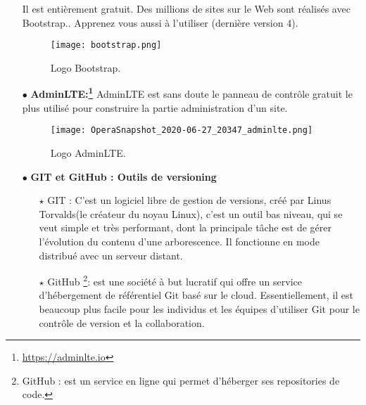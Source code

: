\begin{itemize}
Il est entièrement gratuit. Des millions de sites sur le Web sont réalisés avec Bootstrap.. Apprenez vous aussi à l’utiliser (dernière version 4).\cite{wiki:Bootstrap_(front-end_framework)}
\begin{figure}[ht]
	\centering
	\texttt{[image: bootstrap.png]}
	\caption{Logo Bootstrap.}
	\label{fig:Logo bootstrap }
\end{figure}
\FloatBarrier

\medskip	
\clearpage
\item[$\bullet$] \textbf{ AdminLTE:\footnote{ \url{https://adminlte.io} }} 
AdminLTE est sans doute le panneau de contrôle gratuit le plus utilisé pour construire la partie administration d’un site.

\begin{figure}[ht]
	\centering
	\texttt{[image: OperaSnapshot\_2020-06-27\_20347\_adminlte.png]}
	\caption{Logo AdminLTE.}
	\label{fig:AdminLTE }
\end{figure}
\FloatBarrier



	

\item[$\bullet$] \textbf{ GIT et GitHub : Outils de versioning}

	\begin{itemize}	
	\item[$\star$] GIT :  C'est un logiciel libre de gestion de versions, créé par Linus Torvalds(le créateur du noyau Linux), c’est un outil bas niveau, qui se veut simple et très performant, dont la principale tâche est de gérer l’évolution du contenu d’une arborescence. Il fonctionne en mode distribué avec un serveur distant\cite{wiki:git}.
	\item[$\star$] GitHub \footnote{GitHub : est un service en ligne qui permet d'héberger ses repositories de code.}: est une société à but lucratif qui offre un service d’hébergement de référentiel Git basé sur le cloud. Essentiellement, il est beaucoup plus facile pour les individus et les équipes d’utiliser Git pour le contrôle de version et la collaboration.
	

\end{itemize}
\end{itemize}
